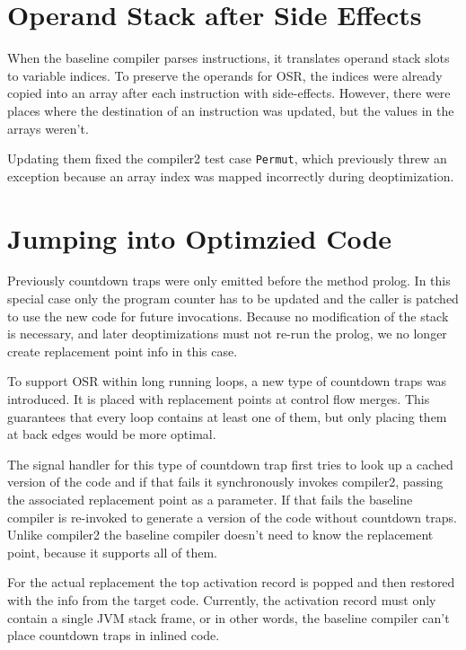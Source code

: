 \documentclass[draft,final]{vutinfth} %
\begin{document}
    \section{Operand Stack after Side Effects}

    When the baseline compiler parses instructions,
    it translates operand stack slots to variable indices.
    To preserve the operands for OSR, the indices were already copied into an array after each instruction with side-effects.
    However, there were places where the destination of an instruction was updated, but the values in the arrays weren't.

    Updating them fixed the compiler2 test case \lstinline{Permut},
    which previously threw an exception because an array index was mapped incorrectly during deoptimization.


    \section{Jumping into Optimzied Code}

    Previously countdown traps were only emitted before the method prolog.
    In this special case only the program counter has to be updated and
    the caller is patched to use the new code for future invocations.
    Because no modification of the stack is necessary,
    and later deoptimizations must not re-run the prolog,
    we no longer create replacement point info in this case.

    To support OSR within long running loops,
    a new type of countdown traps was introduced.
    It is placed with replacement points at control flow merges.
    This guarantees that every loop contains at least one of them,
    but only placing them at back edges would be more optimal.

    The signal handler for this type of countdown trap first tries to look up a cached
    version of the code and if that fails it synchronously invokes compiler2,
    passing the associated replacement point as a parameter.
    If that fails the baseline compiler is re-invoked to generate a version of the code without countdown traps.
    Unlike compiler2 the baseline compiler doesn't need to know the replacement point, because it supports all of them.

    For the actual replacement the top activation record is popped
    and then restored with the info from the target code.
    Currently, the activation record must only contain a single JVM stack frame,
    or in other words,
    the baseline compiler can't place countdown traps in inlined code.
\end{document}
